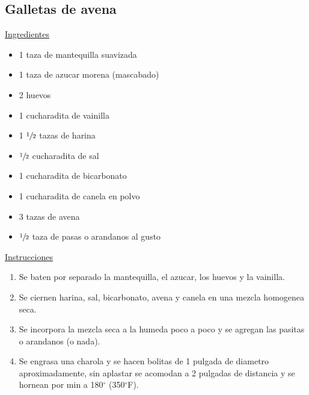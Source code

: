 \subsection{Galletas de avena}

\underline{Ingredientes}
\begin{itemize}
\item 1 taza de mantequilla suavizada
\item 1 taza de azucar morena (mascabado)
\item 2 huevos
\item 1 cucharadita de vainilla
\item 1 $\sfrac{1}{2}$ tazas de harina
\item $\sfrac{1}{2}$ cucharadita de sal
\item 1 cucharadita de bicarbonato
\item 1 cucharadita de canela en polvo
\item 3 tazas de avena
\item $\sfrac{1}{2}$ taza de pasas o arandanos al gusto
\end{itemize}

\underline{Instrucciones}
\begin{enumerate}
\item Se baten por separado la mantequilla, el azucar, los huevos y la vainilla.
\item Se ciernen harina, sal, bicarbonato, avena y canela en una mezcla homogenea seca.
\item Se incorpora la mezcla seca a la humeda poco a poco y se agregan las pasitas o arandanos (o nada).
\item Se engrasa una charola y se hacen bolitas de 1 pulgada de diametro aproximadamente, sin aplastar se acomodan a 2 pulgadas de distancia y se hornean por  min a 180$^\circ$ (350$^\circ$F).\\
\end{enumerate}
